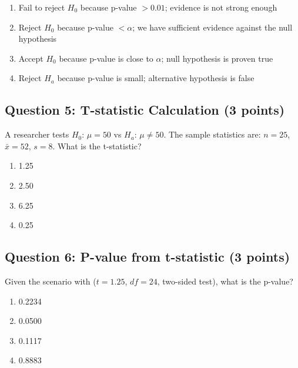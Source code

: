 \documentclass[11pt]{article}
\begin{document}
\begin{enumerate}[label=\Alph*)]
\item Fail to reject $H_0$ because p-value $> 0.01$; evidence is not strong enough
\item Reject $H_0$ because p-value $< \alpha$; we have sufficient evidence against the null hypothesis
\item Accept $H_0$ because p-value is close to $\alpha$; null hypothesis is proven true
\item Reject $H_a$ because p-value is small; alternative hypothesis is false
\end{enumerate}

\vspace{0.5cm}

\subsection*{Question 5: T-statistic Calculation (3 points)}

A researcher tests $H_0$: $\mu = 50$ vs $H_a$: $\mu \neq 50$. The sample statistics are: $n = 25$, $\bar{x} = 52$, $s = 8$. What is the t-statistic?

\begin{enumerate}[label=\Alph*)]
\item 1.25
\item 2.50
\item 6.25
\item 0.25
\end{enumerate}

\vspace{0.5cm}

\subsection*{Question 6: P-value from t-statistic (3 points)}

Given the scenario with ($t = 1.25$, $df = 24$, two-sided test), what is the p-value?

\begin{enumerate}[label=\Alph*)]
\item 0.2234
\item 0.0500
\item 0.1117
\item 0.8883
\end{enumerate}

\vspace{0.5cm}

\newpage
\end{document}
